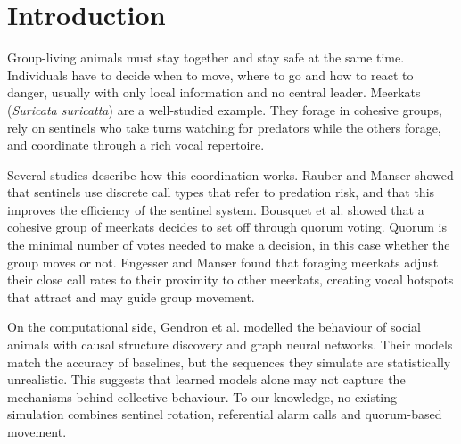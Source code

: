 \documentclass[9pt,twoside]{pnas-new}
\begin{document}

\maketitle
\thispagestyle{firststyle}


\Firstpage




\section{Introduction}
\label{introduction}

Group-living animals must stay together and stay safe at the same time. Individuals have to decide when to move, where to go and how to react to danger, usually with only local information and no central leader. Meerkats (\emph{Suricata suricatta}) are a well-studied example. They forage in cohesive groups, rely on sentinels who take turns watching for predators while the others forage, and coordinate through a rich vocal repertoire.

Several studies describe how this coordination works. Rauber and Manser \cite{rauber2017discrete} showed that sentinels use discrete call types that refer to predation risk, and that this improves the efficiency of the sentinel system. Bousquet et al. \cite{bousquet2011moving} showed that a cohesive group of meerkats decides to set off through quorum voting. Quorum is the minimal number of votes needed to make a decision, in this case whether the group moves or not. Engesser and Manser \cite{engesser2022collective} found that foraging meerkats adjust their close call rates to their proximity to other meerkats, creating vocal hotspots that attract and may guide group movement.

On the computational side, Gendron et al. \cite{gendron2023behaviour} modelled the behaviour of social animals with causal structure discovery and graph neural networks. Their models match the accuracy of baselines, but the sequences they simulate are statistically unrealistic. This suggests that learned models alone may not capture the mechanisms behind collective behaviour. To our knowledge, no existing simulation combines sentinel rotation, referential alarm calls and quorum-based movement.
\end{document}
